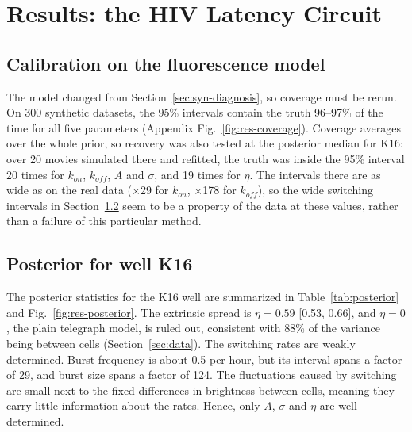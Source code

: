 \chapter{Results: the HIV Latency Circuit}\label{ch:results}

\section{Calibration on the fluorescence model}\label{sec:res-coverage}

The model changed from Section~\ref{sec:syn-diagnosis}, so coverage must be rerun. On 300 synthetic datasets, the 95\% intervals contain the truth 96--97\% of the time for all five parameters (Appendix Fig.~\ref{fig:res-coverage}). Coverage averages over the whole prior, so recovery was also tested at the posterior median for K16: over 20 movies simulated there and refitted, the truth was inside the 95\% interval 20 times for $k_{on}$, $k_{off}$, $A$ and $\sigma$, and 19 times for $\eta$. The intervals there are as wide as on the real data ($\times$29 for $k_{on}$, $\times$178 for $k_{off}$), so the wide switching intervals in Section~\ref{sec:res-posterior} seem to be a property of the data at these values, rather than a failure of this particular method.

\section{Posterior for well K16}\label{sec:res-posterior}

The posterior statistics for the K16 well are summarized in Table~\ref{tab:posterior} and Fig.~\ref{fig:res-posterior}. The extrinsic spread is $\eta = 0.59$ [0.53, 0.66], and $\eta = 0$, the plain telegraph model, is ruled out, consistent with 88\% of the variance being between cells (Section~\ref{sec:data}). The switching rates are weakly determined. Burst frequency is about 0.5 per hour, but its interval spans a factor of 29, and burst size spans a factor of 124. The fluctuations caused by switching are small next to the fixed differences in brightness between cells, meaning they carry little information about the rates. Hence, only $A$, $\sigma$ and $\eta$ are well determined.

